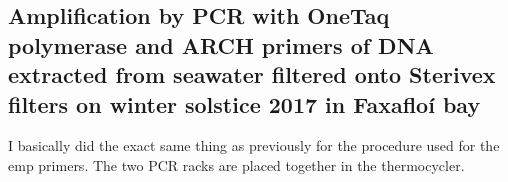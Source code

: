 \subsection{Amplification by PCR with OneTaq\cR~ polymerase and ARCH primers of DNA extracted from seawater filtered onto Sterivex\texttrademark~ filters on winter solstice 2017 in Faxafloí bay}
\label{task:20180201_cj2}

I basically did the exact same thing as previously for the procedure used for the \gls{emp} primers. The two PCR racks are placed together in the thermocycler.